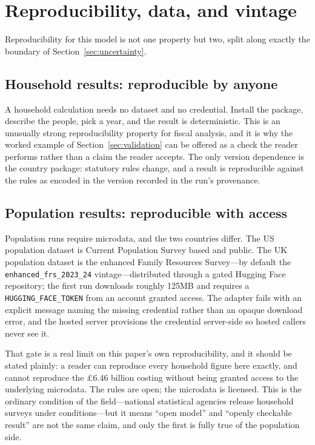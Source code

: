 \section{Reproducibility, data, and vintage}
\label{sec:repro}

Reproducibility for this model is not one property but two, split along exactly the boundary of Section~\ref{sec:uncertainty}.

\subsection{Household results: reproducible by anyone}

A household calculation needs no dataset and no credential. Install the package, describe the people, pick a year, and the result is deterministic. This is an unusually strong reproducibility property for fiscal analysis, and it is why the worked example of Section~\ref{sec:validation} can be offered as a check the reader performs rather than a claim the reader accepts. The only version dependence is the country package: statutory rules change, and a result is reproducible against the rules as encoded in the version recorded in the run's provenance.

\subsection{Population results: reproducible with access}

Population runs require microdata, and the two countries differ. The US population dataset is Current Population Survey based and public. The UK population dataset is the enhanced Family Resources Survey---by default the \texttt{enhanced\_frs\_2023\_24} vintage---distributed through a gated Hugging Face repository; the first run downloads roughly 125MB and requires a \texttt{HUGGING\_FACE\_TOKEN} from an account granted access. The adapter fails with an explicit message naming the missing credential rather than an opaque download error, and the hosted server provisions the credential server-side so hosted callers never see it.

That gate is a real limit on this paper's own reproducibility, and it should be stated plainly: a reader can reproduce every household figure here exactly, and cannot reproduce the \pounds 6.46 billion costing without being granted access to the underlying microdata. The rules are open; the microdata is licensed. This is the ordinary condition of the field---national statistical agencies release household surveys under conditions---but it means ``open model'' and ``openly checkable result'' are not the same claim, and only the first is fully true of the population side.

